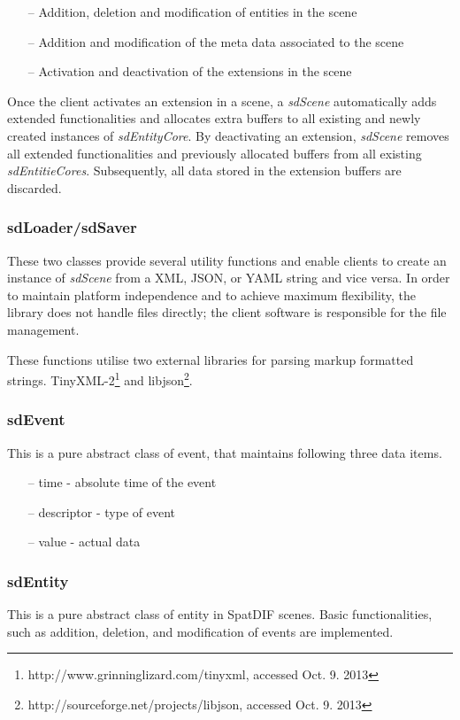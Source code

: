 \documentclass[a4paper]{article}
\begin{document}
\begin{itemize}[leftmargin=*]
\item[--] Addition, deletion and modification of entities in the scene
\item[--] Addition and modification of the meta data associated to the scene
\item[--] Activation and deactivation of the extensions in the scene
\end{itemize}

Once the client activates an extension in a scene, a {\it sdScene} automatically adds extended functionalities and allocates extra buffers to all existing and newly created instances of {\it sdEntityCore}. 
By deactivating an extension, {\it sdScene} removes all extended functionalities and previously allocated buffers from all existing {\it sdEntitieCores}. 
Subsequently, all data stored in the extension buffers are discarded.

\subsubsection{sdLoader/sdSaver}
These two classes provide several utility functions and enable clients to create an instance of {\it sdScene} from a XML, JSON, or YAML string and vice versa. 
In order to maintain platform independence and to achieve maximum flexibility, the library does not handle files directly; the client software is responsible for the file management. 

These functions utilise two external libraries for parsing markup formatted strings. TinyXML-2\footnote{http://www.grinninglizard.com/tinyxml, accessed Oct. 9. 2013} and libjson\footnote{http://sourceforge.net/projects/libjson, accessed Oct. 9. 2013}.

\subsubsection{sdEvent}
This is a pure abstract class of event, that maintains following three data items.

\begin{itemize}[leftmargin=*]
\item[--] time - absolute time of the event
\item[--] descriptor - type of event
\item[--] value - actual data
\end{itemize}

\subsubsection{sdEntity}
This is a pure abstract class of entity in SpatDIF scenes. Basic functionalities, such as addition, deletion, and modification of events are implemented.
\end{document}
